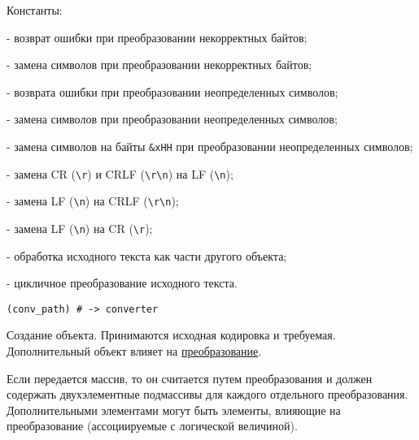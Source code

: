 \begin{keylist}{Константы:}
  
   - возврат ошибки при преобразовании некорректных байтов;
  
   - замена символов при преобразовании некорректных байтов; 
  
   - возврата ошибки при преобразовании неопределенных символов; 
  
   - замена символов при преобразовании неопределенных символов; 
  
   - замена символов на байты \verb!&xHH! при преобразовании неопределенных символов; 
  
   - замена CR (\verb!\r!) и CRLF (\verb!\r\n!) на LF (\verb!\n!); 
  
   - замена LF (\verb!\n!) на CRLF (\verb!\r\n!); 
  
   - замена LF (\verb!\n!) на CR (\verb!\r!); 
  
  
  
  
   - обработка исходного текста как части другого объекта; 
  
   - цикличное преобразование исходного текста.
\end{keylist}

\begin{methodlist}
  \verb!(conv_path) # -> converter!

  Создание объекта. Принимаются исходная кодировка и требуемая. Дополнительный объект влияет на \hyperlink{appencode}{\underline{преобразование}}.

  Если передается массив, то он считается путем преобразования и должен содержать двухэлементные подмассивы для каждого отдельного преобразования. Дополнительными элементами могут быть элементы, влияющие на преобразование (ассоциируемые с логической величиной).
\end{methodlist} 
 
